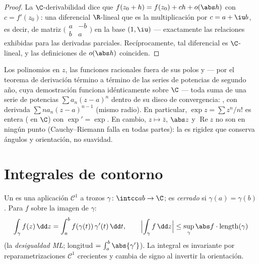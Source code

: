 \begin{proof}
La $\C$-derivabilidad dice que $f(z_0 + h) = f(z_0) + ch +
o(\abs h)$ con $c = f'(z_0)$: una diferencial $\R$-lineal que es la
multiplicación por $c = a + \iu b$, es decir, de matriz
$\bigl(\begin{smallmatrix} a & -b\\ b & a
\end{smallmatrix}\bigr)$ en la base $(1, \iu)$ --- exactamente las
relaciones exhibidas para las derivadas parciales. Recíprocamente, tal
diferencial es $\C$-lineal, y las definiciones de $o(\abs h)$ coinciden.
\end{proof}

\begin{example}\label{ex:b3:holomorphic:examples}
Los polinomios en $z$, las funciones racionales fuera de sus polos y ---
por el teorema de derivación término a término de las series de
potencias de segundo año, cuya demostración funciona idénticamente sobre
$\C$ --- toda suma de una serie de potencias $\sum a_n(z - a)^n$ dentro
de su disco de convergencia:
, con derivada $\sum na_n(z -
a)^{n-1}$ (mismo radio). En particular, $\exp z = \sum z^n/n!$ es entera
( en $\C$) con
$\exp' = \exp$. En cambio, $z \mapsto \bar z$, $\abs z$ y
$\operatorname{Re}z$ no son 
en ningún punto (Cauchy--Riemann falla en todas partes): la
 es rigidez que conserva
ángulos y orientación, no suavidad.
\end{example}

\section{Integrales de contorno}

\begin{definition}\label{def:b3:holomorphic:contour}
Un \emph{} es una
aplicación $\mathcal C^1$ a trozos $\gamma \colon
\intcc ab \to \C$; es \emph{cerrado} si $\gamma(a) =
\gamma(b)$. Para $f$  sobre
la imagen de $\gamma$:
\[
\int_\gamma f(z)\,\dd z =
\int_a^b f(\gamma(t))\,\gamma'(t)\,\dd t,
\qquad
\Bigl|\int_\gamma f\,\dd z\Bigr| \leq
\sup_{\gamma}\abs f\cdot\operatorname{length}(\gamma)
\]
(la \emph{desigualdad ML}; longitud $= \int_a^b\abs{\gamma'}$). La
integral es invariante por reparametrizaciones $\mathcal C^1$ crecientes
y cambia de signo al invertir la orientación.
\end{definition}


